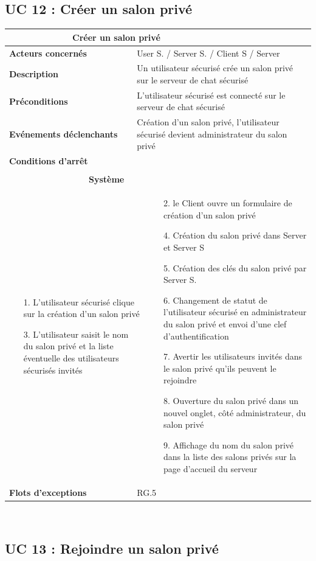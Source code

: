 \documentclass[a4paper,11pt,french]{article}
\newcommand{\fiche}[9] {
	\noindent
\begin{tabular}{|p{3.5cm}| p{1cm} | p{3cm} | p{.5cm} | p{7cm}|} 
\hline
\rowcolor{blue}
\multicolumn{2}{|l|}{\color{white}\bfseries{Nom}} & \multicolumn{3}{l|}{\color{white}\bfseries{#1}}\\
\hline
\multicolumn{2}{|l|}{\bfseries{Acteurs concernés}} & \multicolumn{3}{m{10.5cm}|}{#2}\\
\hline
\multicolumn{2}{|l|}{\bfseries{Description}} & \multicolumn{3}{m{10.5cm}|}{#3}\\
\hline
\multicolumn{2}{|l|}{\bfseries{Préconditions}} & \multicolumn{3}{m{10.5cm}|}{#4}\\
\hline
\multicolumn{2}{|l|}{\bfseries{Evénements déclenchants}} & \multicolumn{3}{m{10.5cm}|}{#5}\\
\hline
\multicolumn{2}{|l|}{\bfseries{Conditions d'arrêt}} & \multicolumn{3}{m{10.5cm}|}{#6}\\
\hline
\rowcolor{gray}
\multicolumn{5}{|c|}{\bfseries{Description du flot d'événements principal}}\\
\hline
\rowcolor{gray}
\multicolumn{3}{|c|}{\bfseries{Acteur(s)}} & \multicolumn{2}{c|}{\bfseries{Système}}\\
\hline
\multicolumn{3}{|p{7.5cm}|}{#7} & \multicolumn{2}{p{7.5cm}|}{#8}\\
\hline
\multicolumn{2}{|l}{\bfseries{Flots d'exceptions}} & \multicolumn{3}{|p{11.5cm}|}{#9}\\
\hline
\end{tabular}
\\
}
\begin{document}
\subsection{UC 12 : Créer un salon privé}

\fiche
	{Créer un salon privé} %
	{User S. / Server S. / Client S / Server} %
	{Un utilisateur sécurisé crée un salon privé sur le serveur de chat sécurisé} %
	{L’utilisateur sécurisé est connecté sur le serveur de chat sécurisé} %
	{Création d’un salon privé, l’utilisateur sécurisé devient administrateur du salon privé} %
	{} %
	{\begin{itemize}  %
		\item [1.] L’utilisateur sécurisé clique sur la création d’un salon privé 
		\item[]  
		\item [3.] L’utilisateur saisit le nom du salon privé et la liste éventuelle des utilisateurs sécurisés invités
	 \end{itemize}
	} 
	{\begin{itemize}  %
		\item []
		\item []
		\item [2.] le Client ouvre un formulaire de création d’un salon privé
		\item []
		\item []
		\item [4.] Création du salon privé dans Server et Server S
		\item [5.] Création des clés du salon privé par Server S.
		\item [6.] Changement de statut de l’utilisateur sécurisé en administrateur du salon privé et envoi d'une clef d'authentification
		\item [7.] Avertir les utilisateurs invités dans le salon privé qu’ils peuvent le rejoindre
		\item [8.] Ouverture du salon privé dans un nouvel onglet, côté administrateur, du salon privé
		\item [9.] Affichage du nom du salon privé dans la liste des salons privés sur la page d’accueil du serveur
	 \end{itemize}
	 }
	{RG.5} %

\subsection{UC 13 : Rejoindre un salon privé}
\end{document}
